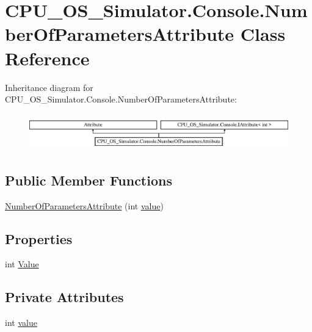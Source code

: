 \hypertarget{class_c_p_u___o_s___simulator_1_1_console_1_1_number_of_parameters_attribute}{}\section{C\+P\+U\+\_\+\+O\+S\+\_\+\+Simulator.\+Console.\+Number\+Of\+Parameters\+Attribute Class Reference}
\label{class_c_p_u___o_s___simulator_1_1_console_1_1_number_of_parameters_attribute}
Inheritance diagram for C\+P\+U\+\_\+\+O\+S\+\_\+\+Simulator.\+Console.\+Number\+Of\+Parameters\+Attribute\+:\begin{figure}[H]
\begin{center}
\leavevmode
\includegraphics[height=1.590909cm]{class_c_p_u___o_s___simulator_1_1_console_1_1_number_of_parameters_attribute}
\end{center}
\end{figure}
\subsection*{Public Member Functions}
\begin{DoxyCompactItemize}
\item 
\hyperlink{class_c_p_u___o_s___simulator_1_1_console_1_1_number_of_parameters_attribute_a41059bf368ee101feb1a32c7468ebc2f}{Number\+Of\+Parameters\+Attribute} (int \hyperlink{class_c_p_u___o_s___simulator_1_1_console_1_1_number_of_parameters_attribute_a74f66203060602ef8135280692dc2064}{value})
\end{DoxyCompactItemize}
\subsection*{Properties}
\begin{DoxyCompactItemize}
\item 
int \hyperlink{class_c_p_u___o_s___simulator_1_1_console_1_1_number_of_parameters_attribute_a7e083af44b45e3e68868d0d5d1991000}{Value}
\end{DoxyCompactItemize}
\subsection*{Private Attributes}
\begin{DoxyCompactItemize}
\item 
int \hyperlink{class_c_p_u___o_s___simulator_1_1_console_1_1_number_of_parameters_attribute_a74f66203060602ef8135280692dc2064}{value}
\end{DoxyCompactItemize}


